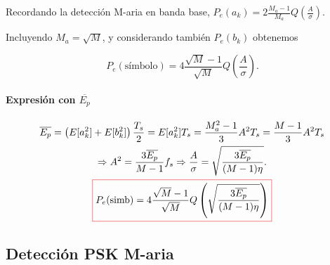 Recordando la detección M-aria en banda base,
$P_e(a_k)=2\frac{M_a-1}{M_a} Q\left(\frac{A}{\sigma}\right)$.

Incluyendo $M_a=\sqrt{M}$, y considerando también $P_e(b_k)$
obtenemos

\[
P_e(\text{símbolo})=4\frac{\sqrt{M}-1}{\sqrt{M}}
Q\left(\frac{A}{\sigma}\right).\]

\paragraph{Expresión con $\overline{E_p}$}

\begin{gather*}
    \overline{E_p}=\left(E[a_k^2]+E[b_k^2]\right)\frac{T_s}{2} =  E[a_k^2]T_s = \frac{M_a^2-1}{3} A^2T_s = \frac{M-1}{3} A^2T_s  \\
    \Rightarrow A^2= \frac{3 \overline{E_p}}{M-1} f_s \Rightarrow \frac{A}{\sigma} = \sqrt{\frac{3\overline{E_p}}{(M-1)\eta}}.\\
    \col{P_e(\text{simb}) = 4\frac{\sqrt{M}-1}{\sqrt{M}}Q\left(\sqrt{\frac{3\overline{E_p}}{(M-1)\eta}}\right)}
\end{gather*}


\subsection*{Detección PSK M-aria}
%
    \begin{center}
\begin{minipage}{0.4\textwidth}
    \end{minipage}%
\end{center}

